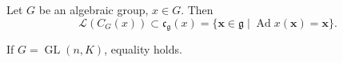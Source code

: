 Let $G$ be an algebraic group, $x \in G$. Then
$$\mathcal{L}(C_G(x)) \subset \mathfrak{c}_\mathfrak{g}(x) = \{\mathbf{x} \in \mathfrak{g} \mid \operatorname{Ad} x(\mathbf{x}) = \mathbf{x}\}.$$

If $G = \operatorname{GL}(n, K)$, equality holds.
